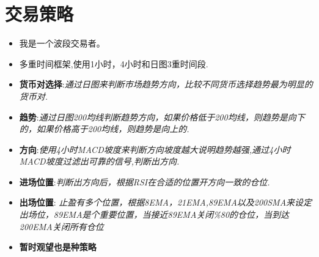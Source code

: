 \chapter{交易策略}

\begin{itemize}
\item 我是一个波段交易者。
\item 多重时间框架,使用1小时，4小时和日图3重时间段.
\item \textbf{货币对选择}:\textit{通过日图来判断市场趋势方向，比较不同货币选择趋势最为明显的货币对.}
\item \textbf{趋势}:\textit{通过日图200均线判断趋势方向，如果价格低于200均线，则趋势是向下的，如果价格高于200均线，则趋势是向上的.}
\item \textbf{方向}:\textit{使用4小时MACD坡度来判断方向坡度越大说明趋势越强,通过4小时MACD坡度过滤出可靠的信号,判断出方向.}
\item \textbf{进场位置}:\textit{判断出方向后，根据RSI在合适的位置开方向一致的仓位.}
\item \textbf{出场位置}: \textit{止盈有多个位置，根据8EMA，21EMA,89EMA以及200SMA来设定出场位，89EMA是个重要位置，当接近89EMA关闭\%80的仓位，当到达200EMA关闭所有仓位}
\item \textbf{暂时观望也是种策略}
\end{itemize}



